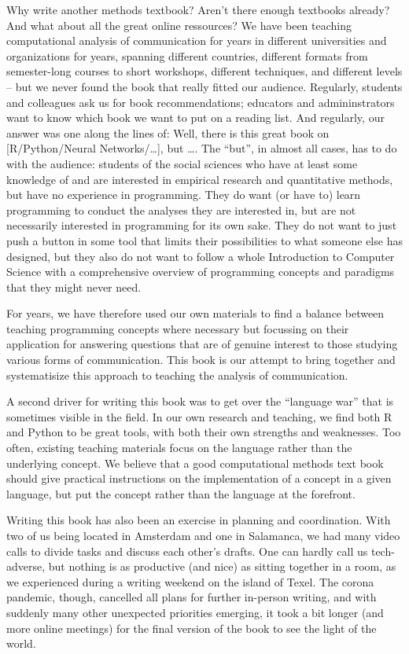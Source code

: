\begin{preface}
Why write another methods textbook? Aren't there enough textbooks already? And what about all the great online ressources?
We have been teaching computational analysis of communication for years in different universities and organizations
for years, spanning different countries, different formats from semester-long courses to short workshops, different techniques,
and different levels -- but we never found the book that really fitted our audience. Regularly, students and colleagues ask
us for book recommendations; educators and admininstrators want to know which book we want to put on a reading list. And regularly,
our answer was one along the lines of: Well, there is this great book on [R/Python/Neural Networks/\ldots], but \ldots.
The ``but'', in almost all cases, has to do with the audience: students of the social sciences who have at least some knowledge of and are
interested in empirical research and quantitative methods, but have no experience in programming. They do want (or have to)
learn programming to conduct the analyses they are interested in, but are not necessarily interested in programming for its own sake.
They do not want to just push a button in some tool that limits their possibilities to what someone else has designed, but they
also do not want to follow a whole Introduction to Computer Science with a comprehensive overview of programming concepts and paradigms
that they might never need.

For years, we have therefore used our own materials to find a balance between teaching programming concepts where necessary but
focussing on their application for answering questions that are of genuine interest to those studying various forms of communication.
This book is our attempt to bring together and systematisize this approach to teaching the analysis of communication.

A second driver for writing this book was to get over the ``language war'' that is sometimes visible in the field. In our own research
and teaching, we find both R and Python to be great tools, with both their own strengths and weaknesses. Too often, existing
teaching materials focus on the language rather than the underlying concept. We believe that a good computational methods text book
should give practical instructions on the implementation of a concept in a given language, but put the concept rather than the language at the forefront.

Writing this book has also been an exercise in planning and coordination. With two of us being located in Amsterdam and one in
Salamanca, we had many video calls to divide tasks and discuss each other's drafts. One can hardly call us tech-adverse, but nothing
is as productive (and nice) as sitting together in a room, as we experienced during a writing weekend on the island of Texel.
The corona pandemic, though, cancelled all plans for further in-person writing, and with suddenly many other unexpected priorities emerging, it took a bit longer (and more online meetings) for the final version of the book to see the light of the world.


\end{preface}
